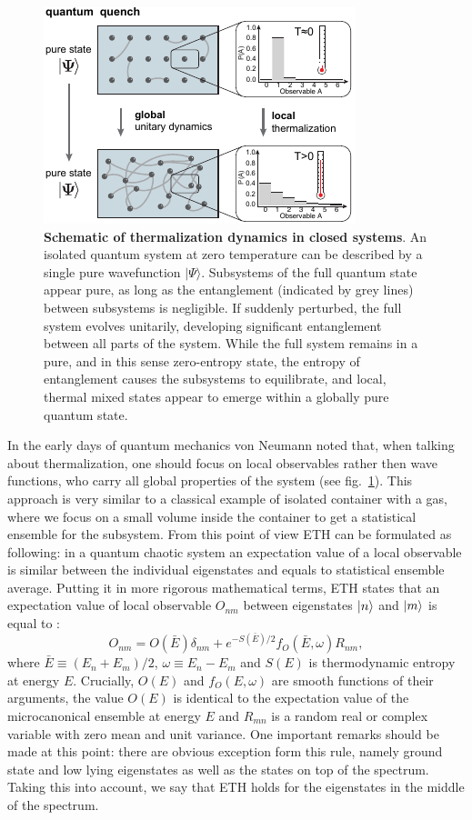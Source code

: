  \begin{figure}[t]
	\centering
	\includegraphics[scale=2]{figures/ETH_fig1.pdf}
	\caption{{\bf Schematic of thermalization dynamics in closed systems}.  An isolated quantum system at zero temperature can be described by a single pure wavefunction $\vert \Psi \rangle$. Subsystems of the full quantum state appear pure, as long as the entanglement (indicated by grey lines) between subsystems is negligible. If suddenly perturbed, the full system evolves unitarily, developing significant entanglement between all parts of the system. While the full system remains in a pure, and in this sense zero-entropy state, the entropy of entanglement causes the subsystems to equilibrate, and local, thermal mixed states appear to emerge within a globally pure quantum state.  }
	\label{fig:ETH_conceptual}
\end{figure}

In the early days of quantum mechanics von Neumann noted that, when talking about thermalization, one should focus on local observables rather then wave functions, who carry all global properties of the system (see fig.~\ref{fig:ETH_conceptual}). This approach is very similar to a classical example of isolated container with a gas, where we focus on a small volume inside the container to get a statistical ensemble for the subsystem. From this point of view ETH can be formulated as following: in a quantum chaotic system an expectation value of a local observable is similar between the individual eigenstates and equals to statistical ensemble average. Putting it in more rigorous mathematical terms, ETH states that an expectation value of local observable $O_{nm}$ between eigenstates $\left|n\right\rangle$ and $\left|m\right\rangle$ is equal to \cite{Srednicki1999}: 
\begin{equation}
O_{nm} = O(\bar{E}) \delta_{nm} + e^{-S(\bar{E})/2} f_O (\bar{E}, \omega) R_{nm},
\end{equation}
where $\bar{E} \equiv (E_n+E_m)/2$, $\omega \equiv E_n-E_m$ and $S(E)$ is thermodynamic entropy at energy $E$. Crucially, $O(E)$ and $f_O(E,ω)$ are smooth functions of their arguments, the value $O(E)$ is identical to the expectation value of the microcanonical ensemble at energy $E$ and $R_{mn}$ is a random real or complex variable with zero mean and unit variance. One important remarks should be made at this point: there are obvious exception form this rule, namely ground state and low lying eigenstates as well as the states on top of the spectrum. Taking this into account, we say that ETH holds for the eigenstates in the middle of the spectrum. 

